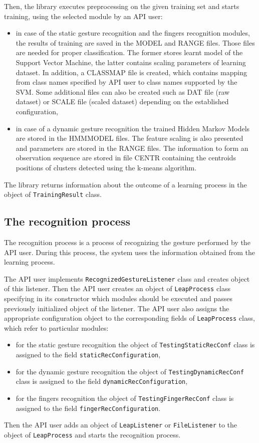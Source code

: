 Then, the library executes preprocessing on the given training set and starts training, using the selected module by an API user:
\begin{itemize}
\item in case of the static gesture recognition and the fingers recognition modules, the results of training are saved in the MODEL and RANGE files. Those files are needed for proper classification. The former stores learnt model of the Support Vector Machine, the latter contains scaling parameters of learning dataset. In addition, a CLASSMAP file is created, which contains mapping from class names specified by API user to class names supported by the SVM. Some additional files can also be created such as DAT file (raw dataset) or SCALE file (scaled dataset) depending on the established configuration,
\item in case of a dynamic gesture recognition the trained Hidden Markov Models are stored in the HMMMODEL files. The feature scaling is also presented and parameters are stored in the RANGE files. The information to form an observation sequence are stored in file CENTR containing the centroids positions of clusters detected using the k-means algorithm.
\end{itemize}

The library returns information about the outcome of a learning process in the object of \linebreak \texttt{TrainingResult} class.


\subsection{The recognition process}
The recognition process is a process of recognizing the gesture performed by the API user. During this process, the system uses the information obtained from the learning process.

The API user implements \texttt{RecognizedGestureListener} class and creates object of this listener. Then the API user creates an object of \texttt{LeapProcess} class specifying in its constructor which modules should be executed and passes previously initialized object of the listener. The API user also assigns the appropriate configuration object to the corresponding fields of \texttt{LeapProcess} class, which refer to particular modules:
\begin{itemize}
\item for the static gesture recognition the object of \texttt{TestingStaticRecConf} class is assigned to the field \texttt{staticRecConfiguration},
\item for the dynamic gesture recognition the object of \texttt{TestingDynamicRecConf} class is assigned to the field \texttt{dynamicRecConfiguration},
\item for the fingers recognition the object of \texttt{TestingFingerRecConf} class is assigned to the field \texttt{fingerRecConfiguration}.
\end{itemize}
Then the API user adds an object of \texttt{LeapListener} or \texttt{FileListener} to the object of \texttt{LeapProcess} and starts the recognition process.


